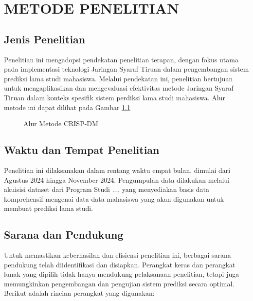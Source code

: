 \chapter{METODE PENELITIAN}

\section{Jenis Penelitian}
Penelitian ini mengadopsi pendekatan penelitian terapan, dengan fokus utama pada implementasi teknologi Jaringan Syaraf Tiruan dalam pengembangan sistem prediksi lama studi mahasiswa. Melalui pendekatan ini, penelitian bertujuan untuk mengaplikasikan dan mengevaluasi efektivitas metode Jaringan Syaraf Tiruan dalam konteks spesifik sistem perdiksi lama studi mahasiswa. Alur metode ini dapat dilihat pada Gambar \ref{fig:crisp-dm-overview}

\begin{figure}[H]
    \centering
    \caption{Alur Metode CRISP-DM \cite{IBM2022}}
    \label{fig:crisp-dm-overview}
\end{figure}

\section{Waktu dan Tempat Penelitian}
Penelitian ini dilaksanakan dalam rentang waktu empat bulan, dimulai dari Agustus 2024 hingga November 2024. Pengumpulan data dilakukan melalui akuisisi dataset dari Program Studi ..., yang menyediakan basis data komprehensif mengenai data-data mahasiswa yang akan digunakan untuk membuat prediksi lama studi.

\section{Sarana dan Pendukung}
Untuk memastikan keberhasilan dan efisiensi penelitian ini, berbagai sarana pendukung telah diidentifikasi dan disiapkan. Perangkat keras dan perangkat lunak yang dipilih tidak hanya mendukung pelaksanaan penelitian, tetapi juga memungkinkan pengembangan dan pengujian sistem prediksi secara optimal. Berikut adalah rincian perangkat yang digunakan:

